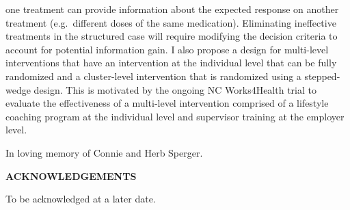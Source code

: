\documentclass[12pt,,letterpaper,twoside]{report}
\begin{document}
one treatment can provide information about the expected response on
another treatment (e.g.~different doses of the same medication).
Eliminating ineffective treatments in the structured case will require
modifying the decision criteria to account for potential information
gain. I also propose a design for multi-level interventions that have an
intervention at the individual level that can be fully randomized and a
cluster-level intervention that is randomized using a stepped-wedge
design. This is motivated by the ongoing NC Works4Health trial to
evaluate the effectiveness of a multi-level intervention comprised of a
lifestyle coaching program at the individual level and supervisor
training at the employer level.

\clearpage


\begin{center}
\vspace*{52pt}

\singlespacing

In loving memory of Connie and Herb Sperger.

\end{center}

\pagebreak


\begin{center}
\vspace*{52pt}
{\normalsize \textbf{ACKNOWLEDGEMENTS}}
\end{center}

To be acknowledged at a later date.

\clearpage


\renewcommand{\contentsname}{TABLE OF CONTENTS}
\renewcommand{\cfttoctitlefont}{\normalsize\bfseries}
\renewcommand{\cftaftertoctitle}{\hfill}
\renewcommand{\cftdotsep}{1.5}
\cftsetrmarg{1.0in}
\end{document}
